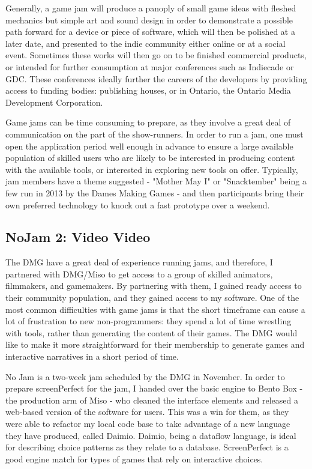 Generally, a game jam will produce a panoply of small game ideas with fleshed mechanics but simple art and sound design in order to demonstrate a possible path forward for a device or piece of software, which will then be polished at a later date, and presented to the indie community either online or at a social event. Sometimes these works will then go on to be finished commercial products, or intended for further consumption at major conferences such as Indiecade or GDC. These conferences ideally further the careers of the developers by providing access to funding bodies: publishing houses, or in Ontario, the Ontario Media Development Corporation.

Game jams can be time consuming to prepare, as they involve a great deal of communication on the part of the show-runners. In order to run a jam, one must open the application period well enough in advance to ensure a large available population of skilled users who are likely to be interested in producing content with the available tools, or interested in exploring new tools on offer. Typically, jam members have a theme suggested - "Mother May I" or "Snacktember" being a few run in 2013 by the Dames Making Games - and then participants bring their own preferred technology to knock out a fast prototype over a weekend.

\subsection{NoJam 2: Video Video}

The DMG have a great deal of experience running jams, and therefore, I partnered with DMG/Miso to get access to a group of skilled animators, filmmakers, and gamemakers. By partnering with them, I gained ready access to their community population, and they gained access to my software. One of the most common difficulties with game jams is that the short timeframe can cause a lot of frustration to new non-programmers: they spend a lot of time wrestling with tools, rather than generating the content of their games. The DMG would like to make it more straightforward for their membership to generate games and interactive narratives in a short period of time. 

No Jam is a two-week jam scheduled by the DMG in November. In order to prepare screenPerfect for the jam, I handed over the basic engine to Bento Box - the production arm of Miso - who cleaned the interface elements and released a web-based version of the software for users. This was a win for them, as they were able to refactor my local code base to take advantage of a new language they have produced, called Daimio. Daimio, being a dataflow language, is ideal for describing choice patterns as they relate to a database. ScreenPerfect is a good engine match for types of games that rely on interactive choices. 

